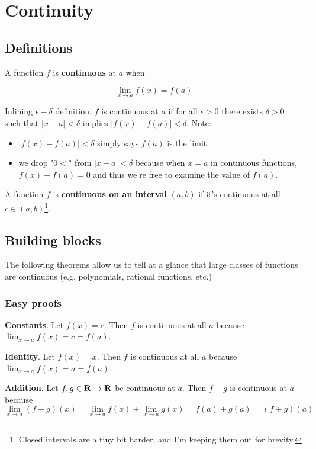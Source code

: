 \section{Continuity}

\subsection{Definitions}

A function $f$ is \textbf{continuous} at $a$ when

\[\lim_{x\to a}f(x)=f(a)\]

Inlining $\epsilon-\delta$ definition, $f$ is continuous at $a$ if for all
$\epsilon>0$ there exists $\delta>0$ such that $|x-a|<\delta$ implies
$|f(x)-f(a)|<\delta$. Note:

\begin{itemize}
    \item $|f(x)-f(a)|<\delta$ simply says $f(a)$ is the limit.
    \item we drop "$0<$" from $|x-a|<\delta$ because when $x=a$ in
      continuous functions, $f(x)-f(a)=0$ and thus we're free to
      examine the value of $f(a)$.
\end{itemize}

A function $f$ is \textbf{continuous on an interval} $(a, b)$ if it's
continuous at all $c\in(a,b)$\footnote{Closed intervals are a tiny bit
  harder, and I'm keeping them out for brevity.}.

\subsection{Building blocks}
The following theorems allow us to tell at a glance that large classes
of functions are continuous (e.g. polynomials, rational functions,
etc.)

\subsubsection{Easy proofs}

\textbf{Constants}. Let $f(x)=c$. Then $f$ is continuous at all $a$
because $\lim_{x\to a}f(x)=c=f(a)$.

\vs

\textbf{Identity}. Let $f(x)=x$. Then $f$ is continuous at all $a$
because $\lim_{x\to a}f(x)=a=f(a)$.

\vs

\textbf{Addition}. Let $f,g\in\mathbf{R}\to\mathbf{R}$ be continuous at $a$. Then
$f+g$ is continuous at $a$ because
\[\lim_{x\to a}(f+g)(x)=\lim_{x\to a}f(x)+\lim_{x\to a}g(x)=f(a)+g(a)=(f+g)(a)\]

